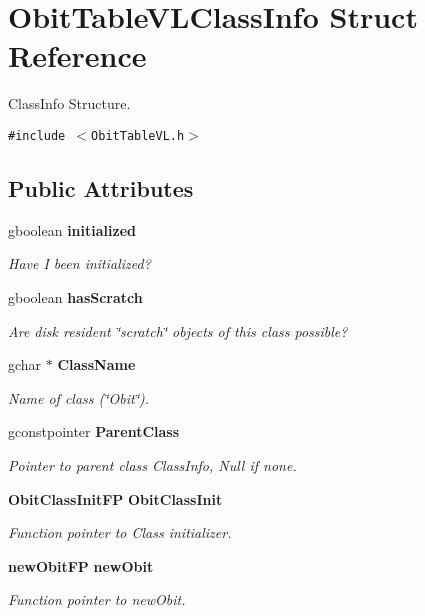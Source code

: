 \section{Obit\-Table\-VLClass\-Info Struct Reference}
\label{structObitTableVLClassInfo}
Class\-Info Structure.  


{\tt \#include $<$Obit\-Table\-VL.h$>$}

\subsection*{Public Attributes}
\begin{CompactItemize}
\item 
gboolean {\bf initialized}
\begin{CompactList}\small\item\em Have I been initialized? \item\end{CompactList}\item 
gboolean {\bf has\-Scratch}
\begin{CompactList}\small\item\em Are disk resident \char`\"{}scratch\char`\"{} objects of this class possible? \item\end{CompactList}\item 
gchar $\ast$ {\bf Class\-Name}
\begin{CompactList}\small\item\em Name of class (\char`\"{}Obit\char`\"{}). \item\end{CompactList}\item 
gconstpointer {\bf Parent\-Class}
\begin{CompactList}\small\item\em Pointer to parent class Class\-Info, Null if none. \item\end{CompactList}\item 
{\bf Obit\-Class\-Init\-FP} {\bf Obit\-Class\-Init}
\begin{CompactList}\small\item\em Function pointer to Class initializer. \item\end{CompactList}\item 
{\bf new\-Obit\-FP} {\bf new\-Obit}
\begin{CompactList}\small\item\em Function pointer to new\-Obit. \item\end{CompactList}\item 

\end{CompactItemize}
